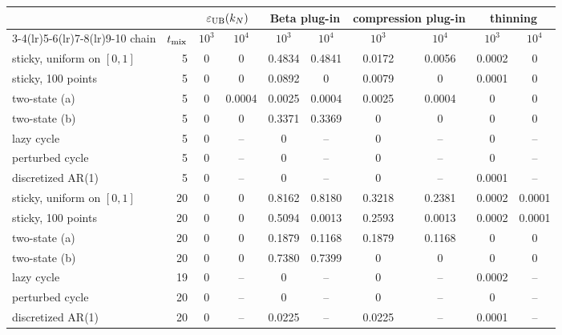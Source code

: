 \begin{tabular}{lrcccccccc}
\toprule
 & & \multicolumn{2}{c}{$\varepsilon_{\rm UB}(k_N)$} & \multicolumn{2}{c}{Beta plug-in} & \multicolumn{2}{c}{compression plug-in} & \multicolumn{2}{c}{thinning} \\
\cmidrule(lr){3-4}\cmidrule(lr){5-6}\cmidrule(lr){7-8}\cmidrule(lr){9-10}
chain & $t_{\rm mix}$ & $10^3$ & $10^4$ & $10^3$ & $10^4$ & $10^3$ & $10^4$ & $10^3$ & $10^4$ \\
\midrule
sticky, uniform on $[0,1]$ & 5 & 0 & 0 & 0.4834 & 0.4841 & 0.0172 & 0.0056 & 0.0002 & 0 \\
sticky, 100 points & 5 & 0 & 0 & 0.0892 & 0 & 0.0079 & 0 & 0.0001 & 0 \\
two-state (a) & 5 & 0 & 0.0004 & 0.0025 & 0.0004 & 0.0025 & 0.0004 & 0 & 0 \\
two-state (b) & 5 & 0 & 0 & 0.3371 & 0.3369 & 0 & 0 & 0 & 0 \\
lazy cycle & 5 & 0 & -- & 0 & -- & 0 & -- & 0 & -- \\
perturbed cycle & 5 & 0 & -- & 0 & -- & 0 & -- & 0 & -- \\
discretized AR(1) & 5 & 0 & -- & 0 & -- & 0 & -- & 0.0001 & -- \\
\addlinespace
sticky, uniform on $[0,1]$ & 20 & 0 & 0 & 0.8162 & 0.8180 & 0.3218 & 0.2381 & 0.0002 & 0.0001 \\
sticky, 100 points & 20 & 0 & 0 & 0.5094 & 0.0013 & 0.2593 & 0.0013 & 0.0002 & 0.0001 \\
two-state (a) & 20 & 0 & 0 & 0.1879 & 0.1168 & 0.1879 & 0.1168 & 0 & 0 \\
two-state (b) & 20 & 0 & 0 & 0.7380 & 0.7399 & 0 & 0 & 0 & 0 \\
lazy cycle & 19 & 0 & -- & 0 & -- & 0 & -- & 0.0002 & -- \\
perturbed cycle & 20 & 0 & -- & 0 & -- & 0 & -- & 0 & -- \\
discretized AR(1) & 20 & 0 & -- & 0.0225 & -- & 0.0225 & -- & 0.0001 & -- \\
\bottomrule
\end{tabular}
